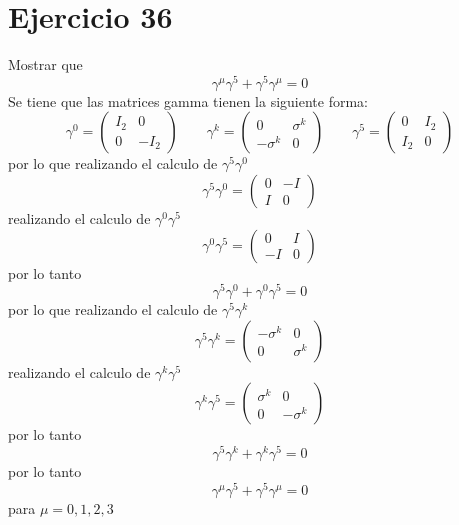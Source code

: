 \section*{Ejercicio 36}
Mostrar que
\begin{equation*}
    \gamma^\mu \gamma^5 + \gamma^5 \gamma^\mu  =0
\end{equation*}
Se tiene que las matrices gamma tienen la siguiente forma: 
\begin{equation*}
    \gamma^0 = \left(\begin{matrix}
        I_2 & 0\\ 0 & -I_2  
    \end{matrix}\right) \qquad
    \gamma^k = \left(\begin{matrix}
         0 & \sigma^k \\  -\sigma^k  & 0
    \end{matrix}\right) \qquad
    \gamma^5 = \left(\begin{matrix}
         0 & I_2\\ I_2  & 0
    \end{matrix}\right)
\end{equation*}
por lo que realizando el calculo de $\gamma^5 \gamma^0$ 
\begin{equation*}
    \gamma^5 \gamma^0 =\left(\begin{matrix}
        0 & -I \\ I & 0
    \end{matrix}\right)
\end{equation*}
realizando el calculo de $\gamma^0 \gamma^5$  
\begin{equation*}
    \gamma^0 \gamma^5 =\left(\begin{matrix}
        0 & I \\ -I & 0
    \end{matrix}\right)
\end{equation*}
por lo tanto
\begin{equation*}
    \gamma^5 \gamma^0 + \gamma^0 \gamma^5 = 0
\end{equation*}
por lo que realizando el calculo de $\gamma^5 \gamma^k$ 
\begin{equation*}
    \gamma^5 \gamma^k =\left(\begin{matrix}
        -\sigma^k & 0 \\ 0 & \sigma^k
    \end{matrix}\right)
\end{equation*}
realizando el calculo de $\gamma^k \gamma^5$  
\begin{equation*}
    \gamma^k \gamma^5 =\left(\begin{matrix}
        \sigma^k & 0 \\ 0 & -\sigma^k
    \end{matrix}\right)
\end{equation*}
por lo tanto
\begin{equation*}
    \gamma^5 \gamma^k + \gamma^k \gamma^5 = 0
\end{equation*}
por lo tanto 
\begin{equation*}
    \gamma^\mu \gamma^5 + \gamma^5 \gamma^\mu  =0
\end{equation*}
para $\mu=0,1,2,3$
